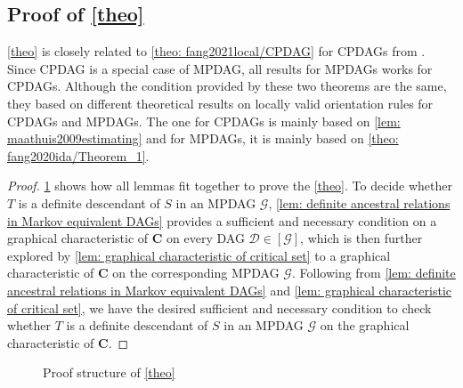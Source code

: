 \documentclass{article}
\begin{document}
\subsection{Proof of \cref{theo}}
   \cref{theo} is closely related to \cref{theo: fang2021local/CPDAG} for CPDAGs from \citep{fang2022local}. Since CPDAG is a special case of MPDAG, all results for MPDAGs works for CPDAGs. Although the condition provided by these two theorems are the same, they based on different theoretical results on locally valid orientation rules for CPDAGs and MPDAGs. The one for CPDAGs is mainly based on \cref{lem: maathuis2009estimating} and for MPDAGs, it is mainly based on \cref{theo: fang2020ida/Theorem_1}.
\begin{proof}%
    \cref{fig: Proof structure of theo} shows how all lemmas fit together to prove the \cref{theo}. To decide whether $T$ is a definite descendant of $S$ in an MPDAG $\mathcal{G}$, \cref{lem: definite ancestral relations in Markov equivalent DAGs} provides a sufficient and necessary condition on a graphical characteristic of $\mathbf{C}$ on every DAG $\mathcal{D} \in [\mathcal{G}]$, which is then further explored by \cref{lem: graphical characteristic of critical set} to a graphical characteristic of $\mathbf{C}$ on the corresponding MPDAG $\mathcal{G}$.
    Following from \cref{lem: definite ancestral relations in Markov equivalent DAGs} and \cref{lem: graphical characteristic of critical set}, we have the desired sufficient and necessary condition to check whether $T$ is a definite descendant of $S$ in an MPDAG $\mathcal{G}$ on the graphical characteristic of $\mathbf{C}$.
\end{proof}


\begin{figure}[htp]
\vskip -0.2in
\begin{center}
\caption{Proof structure of \cref{theo}}
\label{fig: Proof structure of theo}
\end{center}
\end{figure}
\end{document}
